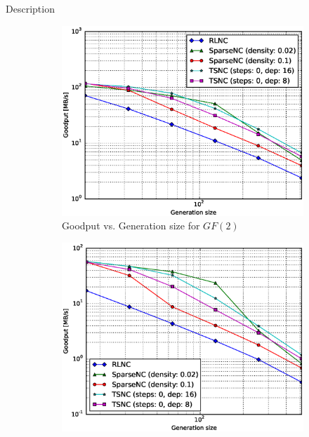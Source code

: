 Description

\begin{figure}
    \centering
    \begin{subfigure}[b]{0.475\textwidth}
        \centering
        \includegraphics[width=1.15\textwidth]{images/23_07_2015/goodput_vs_generation_size_Rasp_v2_decoder_Binary_1600.eps}
        \caption[]%
        {{\small Goodput vs. Generation size for $GF(2)$}}    
        \label{fig:dec_good_rasp2_gen_gf2}
    \end{subfigure}
    \hfill
    \begin{subfigure}[b]{0.475\textwidth}  
        \centering 
        \includegraphics[width=1.15\textwidth]{images/23_07_2015/goodput_vs_generation_size_Rasp_v2_decoder_Binary8_1600.eps}

\end{subfigure}
\end{figure}
